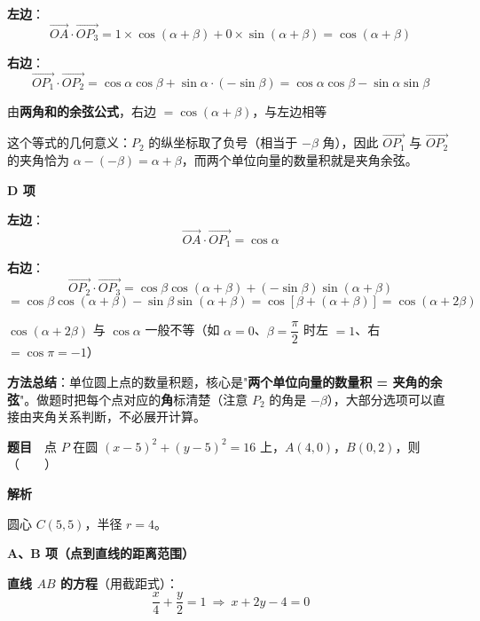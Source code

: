 \textbf{左边}：
\[\overrightarrow{OA}\cdot\overrightarrow{OP_3}=1\times\cos(\alpha+\beta)+0\times\sin(\alpha+\beta)=\cos(\alpha+\beta)\]

\textbf{右边}：
\[\overrightarrow{OP_1}\cdot\overrightarrow{OP_2}=\cos\alpha\cos\beta+\sin\alpha\cdot(-\sin\beta)=\cos\alpha\cos\beta-\sin\alpha\sin\beta\]

由\textbf{两角和的余弦公式}，右边 $=\cos(\alpha+\beta)$，与左边相等 

\begin{gktip}
这个等式的几何意义：$P_2$ 的纵坐标取了负号（相当于 $-\beta$ 角），因此 $\overrightarrow{OP_1}$ 与 $\overrightarrow{OP_2}$ 的夹角恰为 $\alpha-(-\beta)=\alpha+\beta$，而两个单位向量的数量积就是夹角余弦。
\end{gktip}

\par\medskip

\textbf{D 项 }

\textbf{左边}：
\[\overrightarrow{OA}\cdot\overrightarrow{OP_1}=\cos\alpha\]

\textbf{右边}：
\[\overrightarrow{OP_2}\cdot\overrightarrow{OP_3}=\cos\beta\cos(\alpha+\beta)+(-\sin\beta)\sin(\alpha+\beta)\]
\[=\cos\beta\cos(\alpha+\beta)-\sin\beta\sin(\alpha+\beta)=\cos\left[\beta+(\alpha+\beta)\right]=\cos(\alpha+2\beta)\]

$\cos(\alpha+2\beta)$ 与 $\cos\alpha$ 一般不等（如 $\alpha=0$、$\beta=\dfrac\pi2$ 时左 $=1$、右 $=\cos\pi=-1$）


\begin{gktip}
\textbf{方法总结}：单位圆上点的数量积题，核心是"\textbf{两个单位向量的数量积 = 夹角的余弦}"。做题时把每个点对应的\textbf{角}标清楚（注意 $P_2$ 的角是 $-\beta$），大部分选项可以直接由夹角关系判断，不必展开计算。
\end{gktip}

\par\medskip


\textbf{题目}　点 $P$ 在圆 $(x-5)^{2}+(y-5)^{2}=16$ 上，$A(4,0)$，$B(0,2)$，则（　　）

\textbf{解析}

圆心 $C(5,5)$，半径 $r=4$。

\par\medskip

\textbf{A、B 项（点到直线的距离范围）}

\textbf{直线 $AB$ 的方程}（用截距式）：
\[\frac x4+\frac y2=1\ \Longrightarrow\ x+2y-4=0\]

